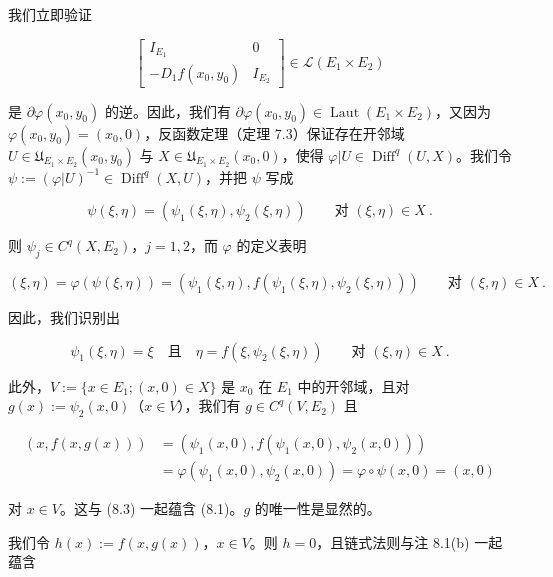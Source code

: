 \begin{theorem}
\begin{subitems}
我们立即验证

\begin{equation*}
\begin{bmatrix}I_{E_{1}} & 0\\ -D_{1}f(x_{0},y_{0}) & I_{E_{2}}\end{bmatrix}\in\mathcal{L}(E_{1}\times E_{2})
\end{equation*}

是 $ \partial\varphi(x_{0},y_{0}) $ 的逆。因此，我们有 $ \partial\varphi(x_{0},y_{0})\in\operatorname{Laut}(E_{1}\times E_{2}) $，又因为 $ \varphi(x_{0},y_{0})=(x_{0},0) $，反函数定理（定理 7.3）保证存在开邻域 $ U\in\mathfrak{U}_{E_{1}\times E_{2}}(x_{0},y_{0}) $ 与 $ X\in\mathfrak{U}_{E_{1}\times E_{2}}(x_{0},0) $，使得 $ \varphi|U\in\operatorname{Diff}^{q}(U,X) $。我们令 $ \psi:=(\varphi|U)^{-1}\in\operatorname{Diff}^{q}(X,U) $，并把 $ \psi $ 写成

\[
\psi(\xi,\eta)=(\psi_{1}(\xi,\eta),\psi_{2}(\xi,\eta))\qquad\text{对 }(\xi,\eta)\in X \ .
\]

则 $ \psi_{j}\in C^{q}(X,E_{2}) $，$ j=1,2 $，而 $ \varphi $ 的定义表明

\[
(\xi,\eta)=\varphi(\psi(\xi,\eta))=(\psi_{1}(\xi,\eta),f(\psi_{1}(\xi,\eta),\psi_{2}(\xi,\eta)))\qquad\text{对 }(\xi,\eta)\in X \ .
\]

因此，我们识别出

\begin{equation}
\psi_{1}(\xi,\eta)=\xi\quad\text{且}\quad\eta=f(\xi,\psi_{2}(\xi,\eta))\qquad\text{对 }(\xi,\eta)\in X \ .\tag{8.3}
\end{equation}

此外，$ V:=\{x\in E_{1};(x,0)\in X\} $ 是 $ x_{0} $ 在 $ E_{1} $ 中的开邻域，且对 $ g(x):=\psi_{2}(x,0) $（$ x\in V $），我们有 $ g\in C^{q}(V,E_{2}) $ 且

\begin{equation*}
\begin{aligned}
(x,f(x,g(x)))&=(\psi_{1}(x,0),f(\psi_{1}(x,0),\psi_{2}(x,0)))\\ &=\varphi(\psi_{1}(x,0),\psi_{2}(x,0))=\varphi\circ\psi(x,0)=(x,0)
\end{aligned}
\end{equation*}

对 $ x\in V $。这与 (8.3) 一起蕴含 (8.1)。$ g $ 的唯一性是显然的。

\item

我们令 $ h(x):=f(x,g(x)) $，$ x\in V $。则 $ h=0 $，且链式法则与注 8.1(b) 一起蕴含


\end{subitems}
\end{theorem}
